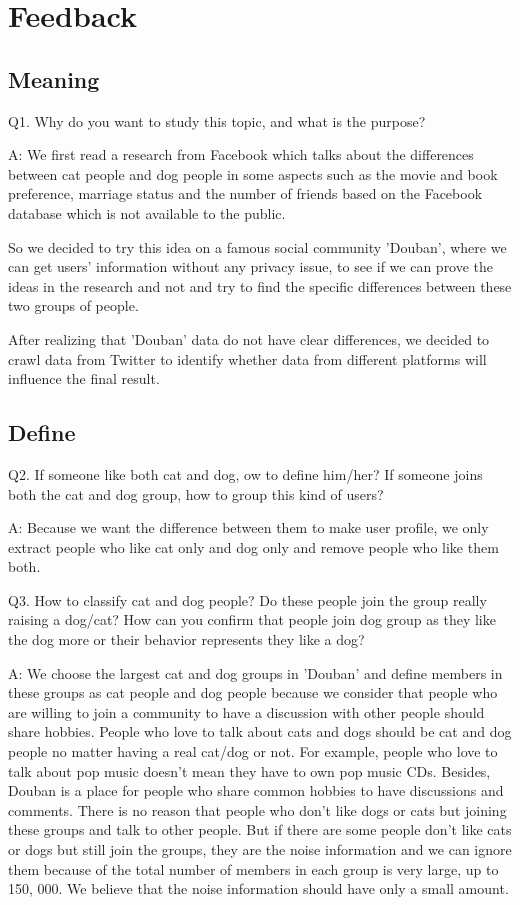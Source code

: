 \documentclass[12pt]{article}
\begin{document}
\section{Feedback}
\subsection{Meaning}
Q1. Why do you want to study this topic, and what is the purpose?

A: We first read a research from Facebook\cite{lada} which talks about the differences between cat people and dog people in some aspects such as the movie and book preference, marriage status and the number of friends based on the Facebook database which is not available to the public.

So we decided to try this idea on a famous social community 'Douban', where we can get users' information without any privacy issue, to see if we can prove the ideas in the research and not and try to find the specific differences between these two groups of people.

After realizing that 'Douban' data do not have clear differences, we decided to crawl data from Twitter to identify whether data from different platforms will influence the final result.

\subsection{Define}

Q2. If someone like both cat and dog, ow to define him/her? If someone joins both the cat and dog group, how to group this kind of users?

A: Because we want the difference between them to make user profile, we only extract people who like cat only and dog only and remove people who like them both.

Q3. How to classify cat and dog people? Do these people join the group really raising a dog/cat? How can you confirm that people join dog group as they like the dog more or their behavior represents they like a dog?

A: We choose the largest cat and dog groups in 'Douban' and define members in these groups as cat people and dog people because we consider that people who are willing to join a community to have a discussion with other people should share hobbies. People who love to talk about cats and dogs should be cat and dog people no matter having a real cat/dog or not. For example, people who love to talk about pop music doesn't mean they have to own pop music CDs. Besides, Douban is a place for people who share common hobbies to have discussions and comments. There is no reason that people who don't like dogs or cats but joining these groups and talk to other people. But if there are some people don't like cats or dogs but still join the groups, they are the noise information and we can ignore them because of the total number of members in each group is very large, up to 150, 000. We believe that the noise information should have only a small amount.
\end{document}
